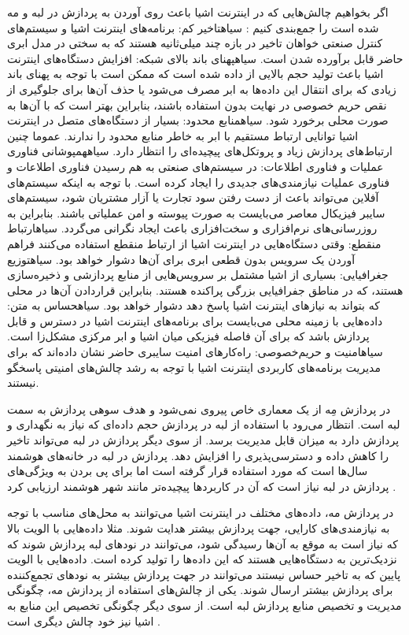 اگر بخواهیم چالش‌هایی که در اینترنت اشیا باعث روی آوردن به پردازش در لبه و مه شده است را جمع‌بندی کنیم
:
 ‌سیاه{تاخیر کم}: برنامه‌های اینترنت اشیا و سیستم‌های کنترل صنعتی خواهان تاخیر در بازه چند میلی‌ثانیه هستند که به سختی در مدل ابری حاضر قابل برآورده شدن است.
 ‌سیاه{پهنای باند بالای شبکه}: افزایش دستگاه‌های اینترنت اشیا باعث تولید حجم بالایی از داده شده است که ممکن است با توجه به پهنای باند زیادی که برای
انتقال این داده‌ها به ابر مصرف می‌شود یا حذف آن‌ها برای جلوگیری از نقص حریم خصوصی در نهایت
بدون استفاده باشند، بنابراین بهتر است که با آن‌ها به صورت محلی برخورد شود.
 ‌سیاه{منابع محدود}: بسیار از دستگاه‌های متصل در اینترنت اشیا توانایی ارتباط مستقیم با ابر به خاطر منابع محدود را ندارند. عموما چنین ارتباط‌های پردازش زیاد و پروتکل‌های پیچیده‌ای را انتظار دارد.
 ‌سیاه{همپوشانی فناوری عملیات و فناوری اطلاعات}: در سیستم‌های صنعتی به هم رسیدن فناوری اطلاعات و فناوری عملیات نیازمندی‌های جدیدی را ایجاد کرده است. با توجه به اینکه سیستم‌های آفلاین
می‌تواند باعث از دست رفتن سود تجارت یا آزار مشتریان شود، سیستم‌های سایبر فیزیکال معاصر می‌بایست به صورت پیوسته و امن عملیاتی باشند. بنابراین به روزرسانی‌های نرم‌افزاری و سخت‌افزاری باعث ایجاد نگرانی می‌گردد.
 ‌سیاه{ارتباط منقطع}: وقتی دستگاه‌هایی در اینترنت اشیا از ارتباط منقطع استفاده می‌کنند فراهم آوردن یک سرویس بدون قطعی ابری برای آن‌ها دشوار خواهد بود.
 ‌سیاه{توزیع جغرافیایی}: بسیاری از اشیا مشتمل بر سرویس‌هایی از منابع پردازشی و ذخیره‌سازی هستند، که در مناطق جفرافیایی بزرگی پراکنده هستند. بنابراین قراردادن آن‌ها در محلی که بتواند به نیازهای اینترنت اشیا پاسخ دهد
دشوار خواهد بود.
 ‌سیاه{حساس به متن}: داده‌هایی با زمینه محلی می‌بایست برای برنامه‌های اینترنت اشیا در دسترس و قابل پردازش باشد که برای آن فاصله فیزیکی میان اشیا و ابر مرکزی مشکل‌زا است.
 ‌سیاه{امنیت و حریم‌خصوصی}: راه‌کارهای امنیت سایبری حاضر نشان داده‌اند که برای مدیریت برنامه‌های کاربردی اینترنت اشیا با توجه به رشد چالش‌های امنیتی پاسخگو نیستند.

در پردازش مِه از یک معماری خاص پیروی نمی‌شود و هدف سوهی پردازش به سمت لبه است. انتظار می‌رود با استفاده از لبه در پردازش حجم داده‌ای که نیاز به نگهداری و پردازش دارد به میزان قابل مدیریت برسد.
از سوی دیگر پردازش در لبه می‌تواند تاخیر را کاهش داده و دسترسی‌پذیری را افزایش دهد. پردازش در لبه در خانه‌های هوشمند سال‌ها است که مورد استفاده قرار گرفته است اما برای پی بردن به ویژگی‌های پردازش در لبه
نیاز است که آن در کاربردها پیچیده‌تر مانند شهر هوشمند ارزیابی کرد
.

در پردازش مه، داده‌های مختلف در اینترنت اشیا می‌توانند به محل‌های مناسب با توجه به نیازمندی‌های کارایی، جهت پردازش بیشتر هدایت شوند. مثلا داده‌هایی با الویت بالا که نیاز است به موقع به آن‌ها رسیدگی شود،
می‌توانند در نودهای لبه پردازش شوند که نزدیک‌ترین به دستگاه‌هایی هستند که این داده‌ها را تولید کرده است. داده‌هایی با الویت پایین که به تاخیر حساس نیستند می‌توانند در جهت پردازش بیشتر به نودهای تجمع‌کننده
برای پردازش بیشتر ارسال شوند.
یکی از چالش‌های استفاده از پردازش مه، چگونگی مدیریت و تخصیص منابع پردازش لبه است. از سوی دیگر چگونگی تخصیص این منابع به اشیا نیز خود چالش دیگری است
.

